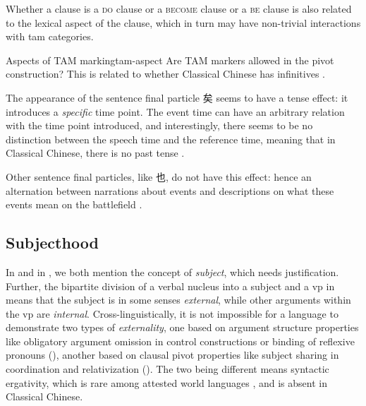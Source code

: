 \documentclass[UTF8, a4paper, oneside, scheme=plain, 12pt]{ctexrep}
\newcommand*{\citepage}[1]{p.~{#1}}
\newcommand*{\citepages}[1]{pp.~{#1}}
\newcommand*{\term}[1]{\emph{#1}}
\newcommand*{\category}[1]{\textsc{#1}}
\begin{document}
Whether a clause is a \category{do} clause or a \category{become} clause or a \category{be} clause
is also related to the lexical aspect of the clause,
which in turn may have non-trivial interactions with \ac{tam} categories.

\begin{todobox}{Aspects of TAM marking}{tam-aspect}
    Are TAM markers allowed in the pivot construction?
    This is related to whether Classical Chinese has infinitives \citep[\citepage{375}]{meiguang2018}.
\end{todobox}

The appearance of the sentence final particle 矣 seems to have a tense effect:
it introduces a \emph{specific} time point.
The event time can have an arbitrary relation with the time point introduced,
and interestingly, there seems to be no distinction between the speech time and the reference time, meaning that in Classical Chinese, there is no past tense \citep[\citepages{437-446}]{meiguang2018}.

Other sentence final particles, like 也, do not have this effect:
hence an alternation between narrations about events 
and descriptions on what these events mean on the battlefield
\citep[\citepages{444-445}]{meiguang2018}.


\subsection{Subjecthood}\label{sec:grammatical.verbal.subject}

In  and in ,
we both mention the concept of \term{subject},
which needs justification.
Further, the bipartite division of a verbal nucleus into a subject and a \ac{vp} in  means that
the subject is in some senses \emph{external},
while other arguments within the \ac{vp} are \emph{internal}.
Cross-linguistically, it is not impossible for a language to demonstrate two types of \term{externality},
one based on argument structure properties like obligatory argument omission in control constructions
or binding of reflexive pronouns
(),
another based on clausal pivot properties like subject sharing in coordination and relativization
().
The two being different means syntactic ergativity,
which is rare among attested world languages \citep{aldridge2008generative},
and is absent in Classical Chinese.
\end{document}
